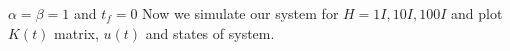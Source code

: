 $\alpha = \beta = 1$ and $t_f= 0$
Now we simulate our system for $H = 1I, 10I, 100I$ and plot $K(t)$ matrix, $u(t)$ and states of system.